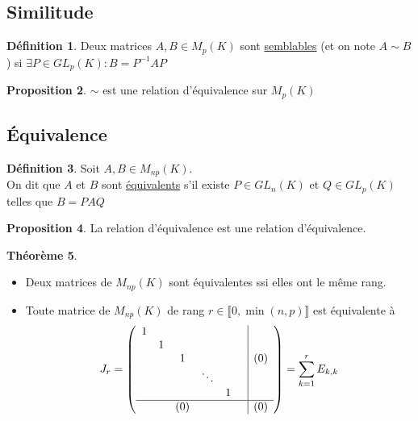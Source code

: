 \documentclass[10pt,a4paper]{article}
\theoremstyle{definition}
\newtheorem{proposition}{Proposition}[section]
\newtheorem{theorem}[proposition]{Théorème}
\newtheorem{definition}[proposition]{Définition}
\begin{document}
\subsection{Similitude}
\begin{definition}
Deux matrices $A, B \in M_p(K)$ sont \uline{semblables} (et on note $A \sim B$) si $\exists P \in GL_p(K) : B = P^{-1}AP$
\end{definition}
\begin{proposition}
$\sim$ est une relation d'équivalence sur $M_p(K)$
\end{proposition}

\subsection{Équivalence}
\begin{definition}
Soit $A, B \in M_{np}(K)$. \\
On dit que $A$ et $B$ sont \uline{équivalents} s'il existe $P \in GL_n(K)$ et $Q \in GL_p(K)$ telles que $B = PAQ$
\end{definition}
\begin{proposition}
La relation d'équivalence est une relation d'équivalence.
\end{proposition}

\pagebreak

\begin{theorem}
\hfill
\begin{itemize}
\item Deux matrices de $M_{np}(K)$ sont équivalentes ssi elles ont le même rang.
\item Toute matrice de $M_{np}(K)$ de rang $r \in \llbracket 0, \min (n, p) \rrbracket$ est équivalente à
\[J_r = \left(\begin{array}{cccccc|c}
1 &   &   &   &   &   & \\  
  & 1 &   &   &   &   & \\
  &   & 1 &   &   &   & (0) \\
  &   &   & \ddots  &   &   &\\
  &   &   &   & 1 &   & \\
\hline
  &   & (0) &   &   &   & (0)
\end{array}\right) = \sum\limits_{k = 1}^{r} E_{k, k} \]
\end{itemize}
\end{theorem}
\end{document}
